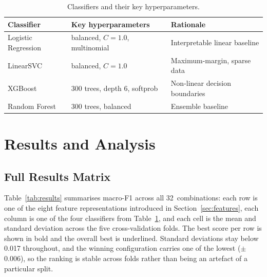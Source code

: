 \documentclass[12pt,a4paper]{article}
\begin{document}
\begin{table}[!htbp]
\centering
\small
\begin{tabularx}{\textwidth}{lXX}
\toprule
\textbf{Classifier} & \textbf{Key hyperparameters} & \textbf{Rationale} \\
\midrule
Logistic Regression & balanced, $C=1.0$, multinomial   & Interpretable linear baseline \\
LinearSVC           & balanced, $C=1.0$                 & Maximum-margin, sparse data \\
XGBoost             & 300 trees, depth 6, softprob       & Non-linear decision boundaries \\
Random Forest       & 300 trees, balanced                & Ensemble baseline \\
\bottomrule
\end{tabularx}
\caption{Classifiers and their key hyperparameters.}
\label{tab:classifiers}
\end{table}

\FloatBarrier

\section{Results and Analysis}
\label{sec:results}

\subsection{Full Results Matrix}

Table~\ref{tab:results} summarises macro-F1 across all 32~combinations: each row is one of the eight feature representations introduced in Section~\ref{sec:features}, each column is one of the four classifiers from Table~\ref{tab:classifiers}, and each cell is the mean and standard deviation across the five cross-validation folds. The best score per row is shown in bold and the overall best is underlined. Standard deviations stay below 0.017 throughout, and the winning configuration carries one of the lowest ($\pm$0.006), so the ranking is stable across folds rather than being an artefact of a particular split.
\end{document}
